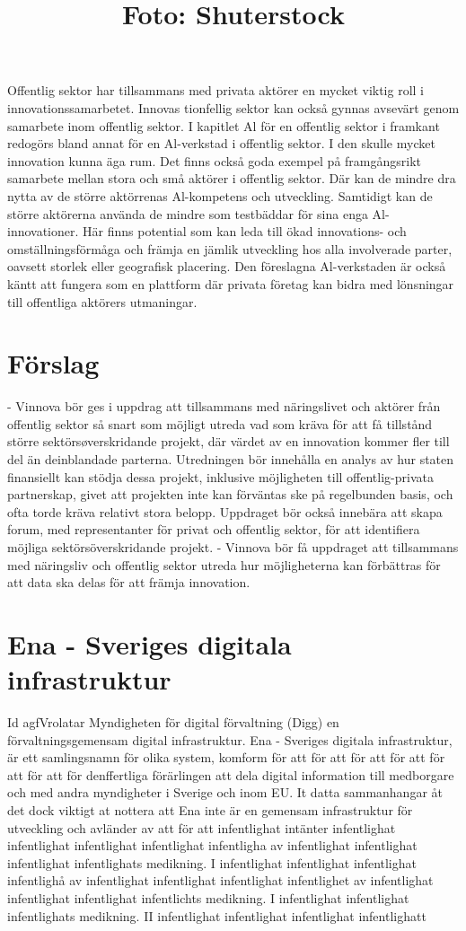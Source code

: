 Offentlig sektor har tillsammans med privata aktörer en mycket viktig roll i innovationssamarbetet. Innovas tionfellig sektor kan också gynnas avsevärt genom samarbete inom offentlig sektor. I kapitlet Al för en offentlig sektor i framkant redogörs bland annat för en Al-verkstad i offentlig sektor. I den skulle mycket innovation kunna äga rum. Det finns också goda exempel på framgångsrikt samarbete mellan stora och små aktörer i offentlig sektor. Där kan de mindre dra nytta av de större aktörrenas Al-kompetens och utveckling. Samtidigt kan de större aktörerna använda de mindre som testbäddar för sina enga Al-innovationer. Här finns potential som kan leda till ökad innovations- och omställningsförmåga och främja en jämlik utveckling hos alla involverade parter, oavsett storlek eller geografisk placering. Den föreslagna Al-verkstaden är också käntt att fungera som en plattform där privata företag kan bidra med lönsningar till offentliga aktörers utmaningar.
\section*{Förslag}
- Vinnova bör ges i uppdrag att tillsammans med näringslivet och aktörer från offentlig sektor så snart som möjligt utreda vad som kräva för att få tillstånd större sektörsøverskridande projekt, där värdet av en innovation kommer fler till del än deinblandade parterna. Utredningen bör innehålla en analys av hur staten finansiellt kan stödja dessa projekt, inklusive möjligheten till offentlig-privata partnerskap, givet att projekten inte kan förväntas ske på regelbunden basis, och ofta torde kräva relativt stora belopp. Uppdraget bör också innebära att skapa forum, med representanter för privat och offentlig sektor, för att identifiera möjliga sektörsöverskridande projekt.
- Vinnova bör få uppdraget att tillsammans med näringsliv och offentlig sektor utreda hur möjligheterna kan förbättras för att data ska delas för att främja innovation.

\title{
Foto: Shuterstock
}
\section*{Ena - Sveriges digitala infrastruktur}
Id agfVrolatar Myndigheten för digital förvaltning (Digg) en förvaltningsgemensam digital infrastruktur. Ena - Sveriges digitala infrastruktur, är ett samlingsnamn för olika system, komform för att för att för att för att för att för att för denffertliga förärlingen att dela digital information till medborgare och med andra myndigheter i Sverige och inom EU. It datta sammanhangar åt det dock viktigt at nottera att Ena inte är en gemensam infrastruktur för utveckling och avländer av att för att infentlighat intänter infentlighat infentlighat infentlighat infentlighat infentligha av infentlighat infentlighat infentlighat infentlighats medikning. I infentlighat infentlighat infentlighat infentlighå av infentlighat infentlighat infentlighat infentlighet av infentlighat infentlighat infentlighat infentlichts medikning. I infentlighat infentlighat infentlighats medikning. II infentlighat infentlighat infentlighat infentlighatt
